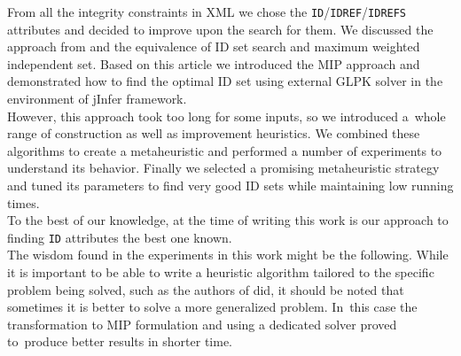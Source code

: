 
From all the integrity constraints in XML we chose the \texttt{ID}/\.\texttt{IDREF}/\.\texttt{IDREFS} attributes and decided to improve upon the search for them. We discussed the approach from \cite{fidax} and the equivalence of ID set search and maximum weighted independent set. Based on this article we introduced the MIP approach and demonstrated how to find the optimal ID set using external GLPK solver in the environment of jInfer framework.\\

However, this approach took too long for some inputs, so we introduced a~whole range of construction as well as improvement heuristics. We combined these algorithms to create a metaheuristic and performed a number of experiments to understand its behavior. Finally we selected a promising metaheuristic strategy and tuned its parameters to find very good ID sets while maintaining low running times.\\

To the best of our knowledge, at the time of writing this work is our approach to finding \texttt{ID} attributes the best one known.\\

The wisdom found in the experiments in this work might be the following. While it is important to be able to write a heuristic algorithm tailored to the specific problem being solved, such as the authors of \cite{fidax} did, it should be noted that sometimes it is better to solve a more generalized problem. In~this case the transformation to MIP formulation and using a dedicated solver proved to~produce better results in shorter time.